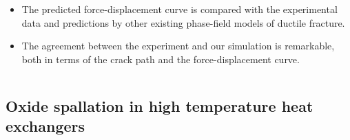 \begin{frame}
\begin{columns}[T]
\begin{column}{0.4\textwidth}
\begin{itemize}
        \item The predicted \textcolor{peggyblue}{force-displacement curve} is compared with the experimental data and predictions by other existing phase-field models of ductile fracture.
        \item The agreement between the experiment and our simulation is \textcolor{peggyblue}{remarkable}, both in terms of the crack path and the force-displacement curve.
      \end{itemize}
    \end{column}
  \end{columns}
\end{frame}

\subsection{Oxide spallation in high temperature heat exchangers}

